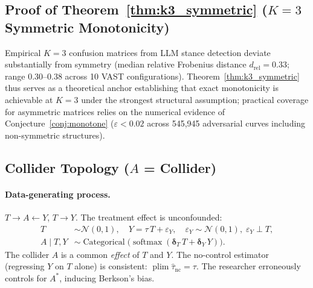 \subsection{Proof of Theorem~\ref{thm:k3_symmetric} ($K{=}3$ Symmetric Monotonicity)}
\label{app:k3_symmetric_proof}



\begin{remark}
\label{rem:symmetry}
Empirical $K{=}3$ confusion matrices from LLM stance detection deviate substantially from symmetry (median relative Frobenius distance $d_{\mathrm{rel}}{=}0.33$; range 0.30--0.38 across 10 VAST configurations). Theorem~\ref{thm:k3_symmetric} thus serves as a theoretical anchor establishing that exact monotonicity is achievable at $K{=}3$ under the strongest structural assumption; practical coverage for asymmetric matrices relies on the numerical evidence of Conjecture~\ref{conj:monotone} ($\varepsilon < 0.02$ across 545{,}945 adversarial curves including non-symmetric structures).
\end{remark}

\subsection{Collider Topology ($A$ = Collider)}
\label{app:collider}

\paragraph{Data-generating process.}
$T\to A\leftarrow Y$, $T\to Y$.
The treatment effect is unconfounded:
\begin{align*}
  T &\sim \mathcal{N}(0,1),\quad
  Y = \tau\,T + \varepsilon_Y,\quad \varepsilon_Y\sim\mathcal{N}(0,1),\;\varepsilon_Y\perp T,\\
  A\mid T,Y &\sim \operatorname{Categorical}\bigl(\operatorname{softmax}(\boldsymbol{\delta}_T\,T + \boldsymbol{\delta}_Y\,Y)\bigr).
\end{align*}
The collider $A$ is a common \emph{effect} of $T$ and $Y$.
The no-control estimator (regressing $Y$ on $T$ alone) is consistent: $\operatorname{plim}\hat\tau_{\mathrm{nc}}=\tau$.
The researcher erroneously controls for $A^*$, inducing Berkson's bias.


